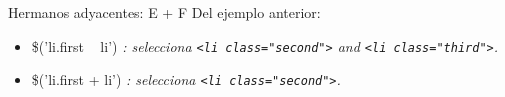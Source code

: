 \begin{frame}[fragile]{Hermanos adyacentes: E + F} %
Del ejemplo anterior:
\begin{itemize}
    \item \$('li.first ~ li') \textit{: selecciona \texttt{<li class="second"\/>}
    and \texttt{<li class="third"\/>}.}
    \item \$('li.first + li') \textit{: selecciona \texttt{<li class="second"\/>}.}
\end{itemize}
\end{frame}


